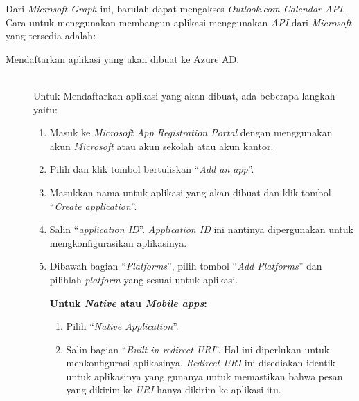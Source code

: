 Dari \textit{Microsoft Graph} ini, barulah dapat mengakses \textit{Outlook.com Calendar API}. Cara untuk menggunakan membangun aplikasi menggunakan \textit{API} dari \textit{Microsoft} yang tersedia adalah:
\begin{description}
\item [Mendaftarkan aplikasi yang akan dibuat ke Azure AD.]\hfill \\ Untuk Mendaftarkan aplikasi yang akan dibuat, ada beberapa langkah yaitu:

\begin{enumerate}
	\item Masuk ke \textit{Microsoft App Registration Portal} dengan menggunakan akun \textit{Microsoft} atau akun sekolah atau akun kantor. 
	\item Pilih dan klik tombol bertuliskan ``\textit{Add an app}''.
	\item Masukkan nama untuk aplikasi yang akan dibuat dan klik tombol ``\textit{Create application}''.
	\item Salin ``\textit{application ID}''. \textit{Application ID} ini nantinya dipergunakan untuk mengkonfigurasikan aplikasinya. 
	\item Dibawah bagian ``\textit{Platforms}'', pilih tombol ``\textit{Add Platforms}'' dan pilihlah \textit{platform} yang sesuai untuk aplikasi. 
	
		\subitem \textbf{Untuk \textit{Native} atau \textit{Mobile apps}:}
		\begin{enumerate}
		\item Pilih ``\textit{Native Application}''.
		\item Salin bagian ``\textit{Built-in redirect URI}''. Hal ini diperlukan untuk menkonfigurasi aplikasinya. \textit{Redirect URI} ini disediakan identik untuk aplikasinya yang gunanya untuk memastikan bahwa pesan yang dikirim ke \textit{URI} hanya dikirim ke aplikasi itu. 
		\end{enumerate}	
		

\end{enumerate}
\end{description}
